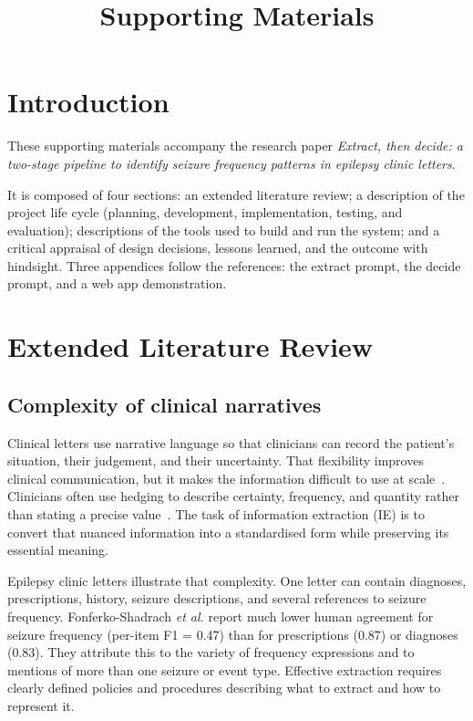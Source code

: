 \documentclass[conference]{IEEEtran}
\begin{document}
\title{Supporting Materials\\}

\section{Introduction}

These supporting materials accompany the research paper
\emph{Extract, then decide: a two-stage pipeline to identify seizure
frequency patterns in epilepsy clinic letters}.

It is composed of four sections: an extended literature
review; a description of the project life cycle (planning, development,
implementation, testing, and evaluation); descriptions
of the tools used to build and run the system; and a critical
appraisal of design decisions, lessons learned, and the outcome
with hindsight. Three appendices follow the references: the
extract prompt, the decide prompt, and a web app demonstration.

\section{Extended Literature Review}

\subsection{Complexity of clinical narratives}

Clinical letters use narrative language so that clinicians can 
record the patient's situation, their judgement, and their 
uncertainty. That flexibility improves clinical communication, 
but it makes the information difficult to use at scale~\cite{b1}. 
Clinicians often use hedging to describe certainty, frequency, 
and quantity rather than stating a precise value~\cite{b2}. 
The task of information extraction (IE) is to convert that
nuanced information into a standardised form while
preserving its essential meaning.

Epilepsy clinic letters illustrate that complexity. One letter 
can contain diagnoses, prescriptions, history, seizure 
descriptions, and several references to seizure frequency. 
Fonferko-Shadrach \emph{et al.} report much lower human 
agreement for seizure frequency (per-item F1 = 0.47) than 
for prescriptions (0.87) or diagnoses (0.83)\cite{b3}. They 
attribute this to the variety of frequency expressions and to 
mentions of more than one seizure or event type. 
Effective extraction requires clearly defined policies and
procedures describing what to extract and how to 
represent it.
\end{document}
